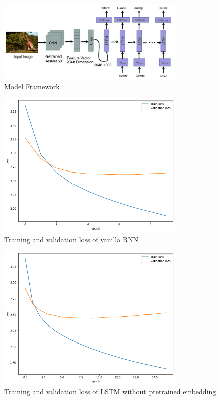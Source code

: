 \documentclass{article} %
\begin{document}
\begin{figure}[htb!]
    \centering
     \includegraphics[width=0.8\textwidth]{frame}
    \caption{Model Framework \cite{10.1007/978-3-030-04780-1_23}}
    \label{loss_fcn}
\end{figure}



\begin{figure}[htb!]
    \centering
     \includegraphics[width=0.8\textwidth]{RNNloss}
    \caption{Training and validation loss of vanilla RNN}
    \label{RNNloss}
\end{figure}

\begin{figure}[htb!]
    \centering
     \includegraphics[width=0.8\textwidth]{lstm_no_pretrain_loss.png}
    \caption{Training and validation loss of LSTM without pretrained embedding}
    \label{loss_lstm_no}
\end{figure}
\end{document}
